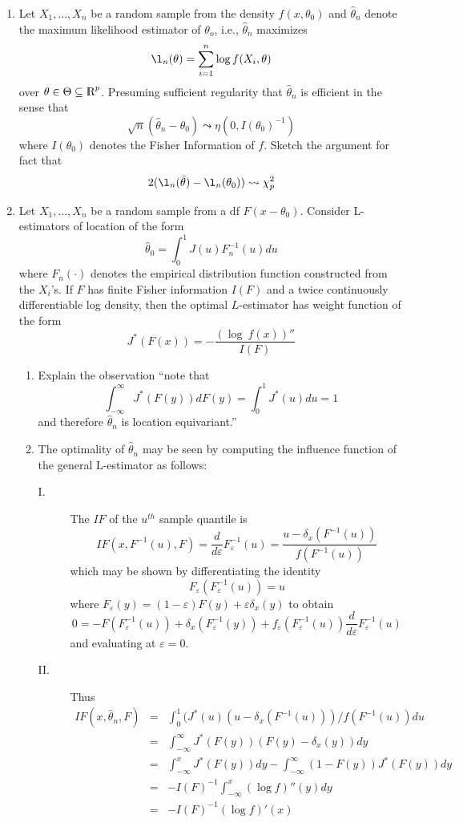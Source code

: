 \vspace{15mm}


\begin{enumerate}
\item Let $X_1, \dots, X_n$ be a random sample from the density 
$f(x, \theta_0)$ and $\hat{\theta}_n$ denote the maximum likelihood estimator of $\theta_o$, 
i.e., $\hat{\theta}_n$ maximizes
\[
\l_n (\theta) = \sum_{i=1}^n \log f(X_i, \theta)
\]
over $\theta \in  \Theta \subseteq \RR^{p}$.  Presuming sufficient regularity 
that $\hat{\theta}_n$ is efficient in the sense that
\[
\sqrt{n}(\hat{\theta}_n-\theta_0) \leadsto \eta (0, I(\theta_0)^{-1})
\]
where $I(\theta_0) $ denotes the Fisher Information of $f$. Sketch the 
argument for fact that 
\[
2(\l_n (\hat{\theta})-\l_n(\theta_0)) \leadsto \chi_{p}^2
\]


\item Let $X_1, \dots , X_n$ be a random sample from a df 
$F(x-\theta_0).$  Consider L-estimators of location of the form
\[
\hat{\theta}_0 = \int_0^1 J(u) F_n^{-1}(u)du
\]
where $F_n(\cdot)$ denotes the empirical distribution function constructed 
from the $X_i$'s.  If $F$ has finite Fisher information $I(F)$ and 
a twice continuously differentiable log density, then the optimal $L$-estimator
has weight function of the form
\[
J^*(F(x)) = - \frac{(\log \: f(x))''}{I(F)}
\]
\begin{enumerate}
\item Explain the observation ``note that
\[
\int_{-\infty}^\infty J^*(F(y))dF(y) = \int_0^1 J^*(u)du = 1
\]
and therefore $\hat{\theta}_n $ is location equivariant.'' 

\item The optimality of $\hat{\theta}_n$ may be seen by computing the 
influence function of the general L-estimator as follows:

\begin{description}
\item[\small I.] The $IF$ of the $u^{th}$ sample quantile is 
\[
IF(x, F^{-1}(u), F) = \frac{d}{d\varepsilon} F_\varepsilon^{-1}(u)  = 
\frac{u-\delta_x (F^{-1}(u))}{f(F^{-1}(u))}
\]
which may be shown by differentiating the identity
\[
F_\varepsilon (F_\varepsilon^{-1}(u))=u
\]
where $F_\varepsilon(y) = (1-\varepsilon)F(y) + \varepsilon \delta_x(y)$ to
obtain 
\[
0 = - F(F_\varepsilon^{-1}(u)) + \delta_x (F_\varepsilon^{-1}(y)) + 
f_\varepsilon(F_\varepsilon^{-1}(u))\frac{d}{d\varepsilon}F_\varepsilon^{-1}(u)
\]
and evaluating at $\varepsilon = 0 .$
\item[\small II.] Thus
\begin{eqnarray*}
IF(x, \hat{\theta}_n, F) &=& \int_0^1(J^*(u)(u-\delta_x(F^{-1}(u)))/f(F^{-1}(u))du \\
&=& \int_{-\infty}^\infty J^*(F(y))(F(y)-\delta_x(y))dy\\
&=& \int_{-\infty}^x J^*(F(y))dy - \int_{-\infty}^\infty (1-F(y))J^*(F(y))dy \\
&=& -I(F)^{-1} \int_{-\infty}^x (\log f)'' (y)dy \\
&=& -I(F)^{-1}(\log f)'(x)
\end{eqnarray*}


\end{description}
\end{enumerate}
\end{enumerate}
